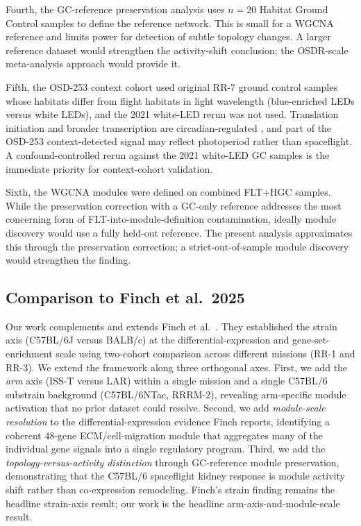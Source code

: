 \documentclass[11pt]{article}
\begin{document}
Fourth, the GC-reference preservation analysis uses $n{=}20$ Habitat Ground Control samples to define the reference network. This is small for a WGCNA reference and limits power for detection of subtle topology changes. A larger reference dataset would strengthen the activity-shift conclusion; the OSDR-scale meta-analysis approach \citep{ray2019genelab} would provide it.

Fifth, the OSD-253 context cohort used original RR-7 ground control samples whose habitats differ from flight habitats in light wavelength (blue-enriched LEDs versus white LEDs), and the 2021 white-LED rerun was not used. Translation initiation and broader transcription are circadian-regulated \citep{aviram2021circadian}, and part of the OSD-253 context-detected signal may reflect photoperiod rather than spaceflight. A confound-controlled rerun against the 2021 white-LED GC samples is the immediate priority for context-cohort validation.

Sixth, the WGCNA modules were defined on combined FLT+HGC samples. While the preservation correction with a GC-only reference addresses the most concerning form of FLT-into-module-definition contamination, ideally module discovery would use a fully held-out reference. The present analysis approximates this through the preservation correction; a strict-out-of-sample module discovery would strengthen the finding.

\subsection{Comparison to Finch et al.\ 2025}

Our work complements and extends Finch et al.\ \citep{finch2025strain}. They established the strain axis (C57BL/6J versus BALB/c) at the differential-expression and gene-set-enrichment scale using two-cohort comparison across different missions (RR-1 and RR-3). We extend the framework along three orthogonal axes. First, we add the \emph{arm} axis (ISS-T versus LAR) within a single mission and a single C57BL/6 substrain background (C57BL/6NTac, RRRM-2), revealing arm-specific module activation that no prior dataset could resolve. Second, we add \emph{module-scale resolution} to the differential-expression evidence Finch reports, identifying a coherent 48-gene ECM/cell-migration module that aggregates many of the individual gene signals into a single regulatory program. Third, we add the \emph{topology-versus-activity distinction} through GC-reference module preservation, demonstrating that the C57BL/6 spaceflight kidney response is module activity shift rather than co-expression remodeling. Finch's strain finding remains the headline strain-axis result; our work is the headline arm-axis-and-module-scale result.
\end{document}

